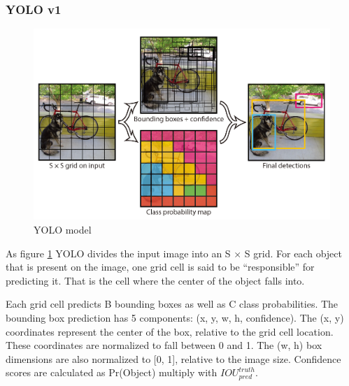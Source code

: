 \subsubsection{YOLO v1}
\begin{figure}[!b]
\centering
\includegraphics[width=14cm]{Images/recognition/YOLO.png}
\caption{YOLO model}
\label{fig: YOLO model}
\end{figure}
As figure \ref{fig: YOLO model} YOLO divides the input image into an S × S grid. For each object that is present on the image, one grid cell is said to be “responsible” for predicting it. That is the cell where the center of the object falls into. 

Each grid cell predicts B bounding boxes as well as C class probabilities. The bounding box prediction has 5 components: (x, y, w, h, confidence). The (x, y) coordinates represent the center of the box, relative to the grid cell location. These coordinates are normalized to fall between 0 and 1. The (w, h) box dimensions are also normalized to [0, 1], relative to the image size. Confidence scores are calculated as Pr(Object) multiply with $IOU_{pred}^{truth}$.

